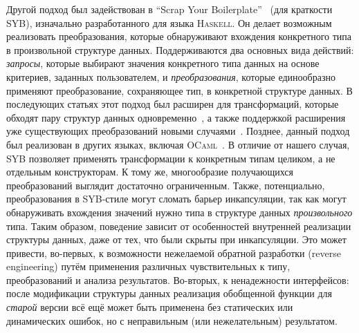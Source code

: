 Другой подход был задействован в ``Scrap Your Boilerplate''~\cite{SYB} (для краткости SYB), изначально разработанного для языка \textsc{Haskell}. Он делает возможным реализовать преобразования,  которые обнаруживают вхождения конкретного типа в произвольной структуре данных. Поддерживаются два основных вида действий: \emph{запросы}, которые выбирают значения конкретного типа данных на основе критериев, заданных пользователем, и \emph{преобразования}, которые единообразно применяют преобразование, сохраняющее тип, в конкретной структуре данных. В последующих статьях этот подход был расширен для трансформаций, которые обходят пару структур данных одновременно~\cite{SYB1}, а также поддержкой расширения уже существующих преобразований новыми случаями~\cite{SYB2}. Позднее, данный подход был реализован в других языках, включая \textsc{OCaml}~\cite{SYBOCaml,Staged}. В отличие от нашего случая, SYB позволяет применять трансформации к конкретным типам целиком, а не отдельным конструкторам. К тому же, многообразие получающихся преобразований выглядит достаточно ограниченным. Также, потенциально, преобразования в SYB-стиле могут сломать барьер инкапсуляции, так как могут обнаруживать вхождения значений нужно типа в структуре данных \emph{произвольного} типа. Таким образом, поведение зависит от особенностей внутренней реализации структуры данных, даже от тех, что были скрыты при инкапсуляции. Это может привести, во-первых, к возможности нежелаемой обратной разработки (reverse engineering) путём применения различных чувствительных к типу, преобразований и анализа результатов. Во-вторых, к ненадежности интерфейсов: после модификации структуры данных реализация обобщенной функции для \emph{старой} версии всё ещё может быть применена без статических или динамических ошибок, но с неправильным (или нежелательным) результатом.

